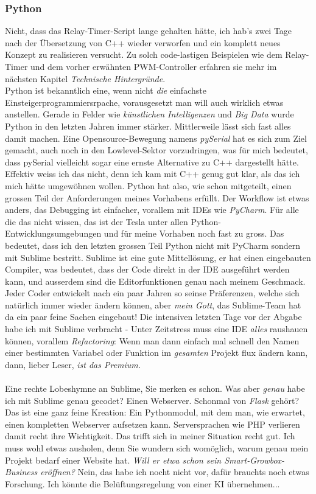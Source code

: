 \documentclass[12pt,titlepage,a4paper]{article}
\begin{document}
\subsubsection{Python}
Nicht, dass das Relay-Timer-Script lange gehalten hätte, ich hab's zwei Tage nach der Übersetzung von C++ wieder verworfen und ein komplett neues Konzept zu realisieren versucht. Zu solch code-lastigen Beispielen wie dem Relay-Timer und dem vorher erwähnten PWM-Controller erfahren sie mehr im nächsten Kapitel \textit{Technische Hintergründe}.\\Python ist bekanntlich eine, wenn nicht \textit{die} einfachste Einsteigerprogrammiersrpache, vorausgesetzt man will auch wirklich etwas anstellen. Gerade in Felder wie \textit{künstlichen Intelligenzen} und\textit{ Big Data} wurde Python in den letzten Jahren immer stärker. Mittlerweile lässt sich fast alles damit machen. Eine Opensource-Bewegung namens \textit{pySerial} hat es sich zum Ziel gemacht, auch noch in den Lowlevel-Sektor vorzudringen, was für mich bedeutet, dass pySerial vielleicht sogar eine ernste Alternative zu C++ dargestellt hätte. Effektiv weiss ich das nicht, denn ich kam mit C++ genug gut klar, als das ich mich hätte umgewöhnen wollen. Python hat also, wie schon mitgeteilt, einen grossen Teil der Anforderungen meines Vorhabens erfüllt. Der Workflow ist etwas anders, das Debugging ist einfacher, vorallem mit IDEs wie \textit{PyCharm}. Für alle die das nicht wissen, das ist der Tesla unter allen Python-Entwicklungsumgebungen und für meine Vorhaben noch fast zu gross. Das bedeutet, dass ich den letzten grossen Teil Python nicht mit PyCharm sondern mit Sublime bestritt. Sublime ist eine gute Mittellösung, er hat einen eingebauten Compiler, was bedeutet, dass der Code direkt in der IDE ausgeführt werden kann, und ausserdem sind die Editorfunktionen genau nach meinem Geschmack. Jeder Coder entwickelt nach ein paar Jahren so seinse Präferenzen, welche sich natürlich immer wieder ändern können, aber \textit{mein Gott}, das Sublime-Team hat da ein paar feine Sachen eingebaut! Die intensiven letzten Tage vor der Abgabe habe ich mit Sublime verbracht - Unter Zeitstress muss eine IDE \textit{alles} raushauen können, vorallem \textit{Refactoring}: Wenn man dann einfach mal schnell den Namen einer bestimmten Variabel oder Funktion im \textit{gesamten} Projekt flux ändern kann, dann, lieber Leser, \textit{ist das Premium.}
\\ \\ 
Eine rechte Lobeshymne an Sublime, Sie merken es schon. Was aber \textit{genau} habe ich mit Sublime genau gecodet? Einen Webserver. Schonmal von \textit{Flask} gehört? Das ist eine ganz feine Kreation: Ein Pythonmodul, mit dem man, wie erwartet, einen kompletten Webserver aufsetzen kann. Serversprachen wie PHP verlieren damit recht ihre Wichtigkeit. Das trifft sich in meiner Situation recht gut. Ich muss wohl etwas ausholen, denn Sie wundern sich womöglich, warum genau mein Projekt bedarf einer Website hat. \textit{Will er etwa schon sein Smart-Growbox-Business eröffnen?} Nein, das habe ich nocht nicht vor, dafür brauchts noch etwas Forschung. Ich könnte die Belüftungsregelung von einer KI übernehmen... \\
\end{document}

